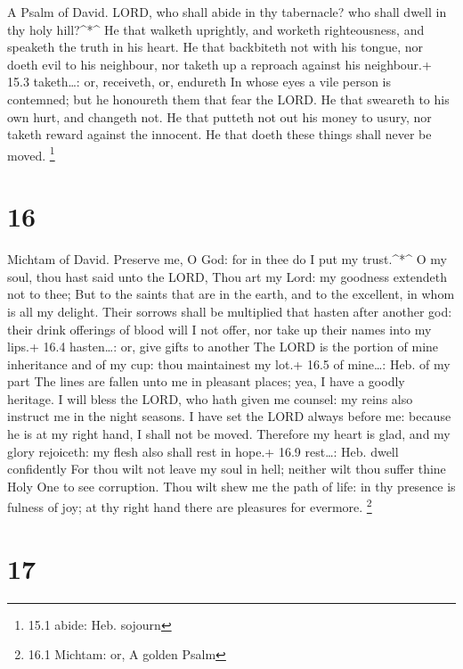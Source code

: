 A Psalm of David.  LORD, who shall abide in thy tabernacle?
who shall dwell in thy holy hill?\^{}*\^{}  He that walketh
uprightly, and worketh righteousness, and speaketh the truth in his
heart.  He that backbiteth not with his tongue, nor doeth
evil to his neighbour, nor taketh up a reproach against his neighbour.+
15.3 taketh\ldots: or, receiveth, or, endureth  In whose
eyes a vile person is contemned; but he honoureth them that fear the
LORD. He that sweareth to his own hurt, and changeth not. 
He that putteth not out his money to usury, nor taketh reward against
the innocent. He that doeth these things shall never be moved.
\footnote{15.1 abide: Heb. sojourn}

\hypertarget{section-15}{%
\section{16}\label{section-15}}

Michtam of David.  Preserve me, O God: for in thee do I put
my trust.\^{}*\^{}  O my soul, thou hast said unto the LORD,
Thou art my Lord: my goodness extendeth not to thee;  But to
the saints that are in the earth, and to the excellent, in whom is all
my delight.  Their sorrows shall be multiplied that hasten
after another god: their drink offerings of blood will I not offer, nor
take up their names into my lips.+ 16.4 hasten\ldots: or, give gifts to
another  The LORD is the portion of mine inheritance and of
my cup: thou maintainest my lot.+ 16.5 of mine\ldots: Heb. of my part
 The lines are fallen unto me in pleasant places; yea, I
have a goodly heritage.  I will bless the LORD, who hath
given me counsel: my reins also instruct me in the night seasons.
 I have set the LORD always before me: because he is at my
right hand, I shall not be moved.  Therefore my heart is
glad, and my glory rejoiceth: my flesh also shall rest in hope.+ 16.9
rest\ldots: Heb. dwell confidently  For thou wilt not leave
my soul in hell; neither wilt thou suffer thine Holy One to see
corruption.  Thou wilt shew me the path of life: in thy
presence is fulness of joy; at thy right hand there are pleasures for
evermore. \footnote{16.1 Michtam: or, A golden Psalm}

\hypertarget{section-16}{%
\section{17}\label{section-16}}

